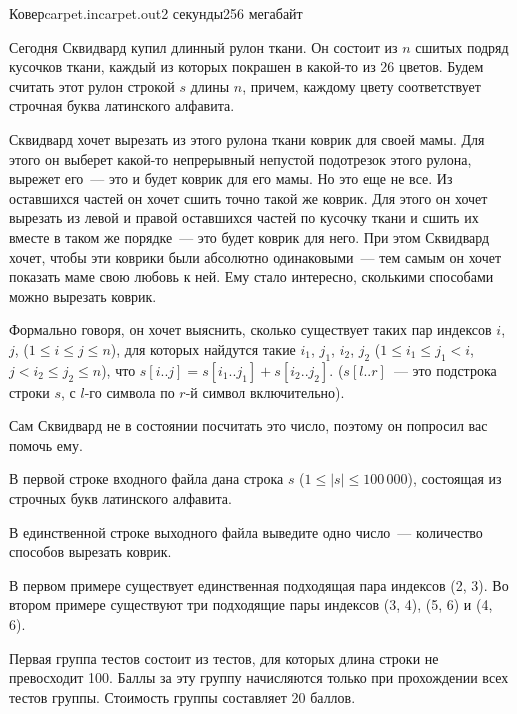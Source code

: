 \begin{problem}{Ковер}{carpet.in}{carpet.out}{2 секунды}{256 мегабайт}


Сегодня Сквидвард купил длинный рулон ткани. Он состоит из $n$ сшитых подряд кусочков ткани, каждый из которых покрашен в какой-то из 26 цветов. 
Будем считать этот рулон строкой $s$ длины $n$, причем, каждому цвету соответствует строчная буква латинского алфавита.

Сквидвард хочет вырезать из этого рулона ткани коврик для своей мамы. Для этого он выберет какой-то непрерывный непустой подотрезок этого рулона,
вырежет его~--- это и будет коврик для его мамы. Но это еще не все. Из оставшихся частей он хочет сшить точно такой же коврик. Для этого он хочет
вырезать из левой и правой оставшихся частей по кусочку ткани и сшить их вместе в таком же порядке~--- это будет коврик для него.
При этом Сквидвард хочет, чтобы эти коврики были абсолютно одинаковыми~--- тем самым он хочет показать маме свою любовь к ней. 
Ему стало интересно, сколькими способами можно вырезать коврик. 

Формально говоря, он хочет выяснить, сколько существует таких пар индексов $i$, $j$, ($1 \le i \le j \le n$), для которых найдутся такие $i_1$, 
$j_1$, $i_2$, $j_2$ ($1 \le i_1 \le j_1 < i$,  $j < i_2 \le j_2 \le n$), что $s[i..j] = s[i_1..j_1] + s[i_2..j_2]$.
($s[l..r]$~--- это подстрока строки $s$, с $l$-го символа по $r$-й символ включительно).

Сам Сквидвард не в состоянии посчитать это число, поэтому он попросил вас помочь ему.

\InputFile
В первой строке входного файла дана строка $s$ ($1 \le |s| \le 100\,000$), состоящая из строчных букв латинского алфавита.

\OutputFile
В единственной строке выходного файла выведите одно число~--- количество способов вырезать коврик.

\Example
\begin{example}%
%
%
\end{example}

\Note
В первом примере существует единственная подходящая пара индексов (2, 3).
Во втором примере существуют три подходящие пары индексов (3, 4), (5, 6) и (4, 6).
 
\Testing
Первая группа тестов состоит из тестов, для которых длина строки не превосходит 100. Баллы 
за эту группу начисляются только при прохождении всех тестов группы. Стоимость группы составляет 20 баллов.


\end{problem}
